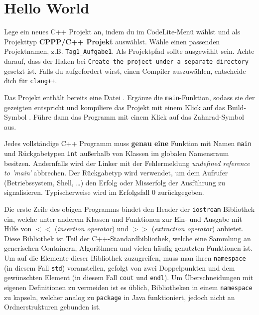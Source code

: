 
\section{\ExercisePrefixBasics Hello World}
Lege ein neues C++ Projekt an, indem du  im CodeLite-Menü wählst und als Projekttyp \textbf{CPPP/C++ Projekt} auswählst.
Wähle einen passenden Projektnamen, z.B. \texttt{Tag1\_Aufgabe1}.
Als Projektpfad sollte  ausgewählt sein. Achte darauf, dass der Haken bei \texttt{Create the project under a separate directory} gesetzt ist.
Falls du aufgefordert wirst, einen Compiler auszuwählen, entscheide dich für \texttt{clang++}.

Das Projekt enthält bereits eine Datei .
Ergänze die \texttt{main}-Funktion, sodass sie der gezeigten entspricht und kompiliere das Projekt mit einem Klick auf das Build-Symbol .
Führe dann das Programm mit einem Klick auf das Zahnrad-Symbol  aus.


Jedes vollständige C++ Programm muss \textbf{genau eine} Funktion mit Namen \lstinline{main} und Rückgabetypen \lstinline{int} außerhalb von Klassen im globalen Namensraum besitzen.
Andernfalls wird der Linker mit der Fehlermeldung \emph{undefined reference to 'main'} abbrechen.
Der Rückgabetyp wird verwendet, um dem Aufrufer (Betriebssystem, Shell, \dots) den Erfolg oder Misserfolg der Ausführung zu signalisieren.
Typischerweise wird im Erfolgsfall 0 zurückgegeben.

Die erste Zeile des obigen Programms bindet den Header der \lstinline{iostream} Bibliothek ein, welche unter anderem Klassen und Funktionen zur Ein- und Ausgabe mit Hilfe von $<<$ (\emph{insertion operator}) und $>>$ (\emph{extraction operator}) anbietet.
Diese Bibliothek ist Teil der C++-Standardbibliothek, welche eine Sammlung an generischen Containern, Algorithmen und vielen häufig genutzten Funktionen ist.
Um auf die Elemente dieser Bibliothek zuzugreifen, muss man ihren \lstinline{namespace} (in diesem Fall \lstinline{std}) voranstellen, gefolgt von zwei Doppelpunkten und dem gewünschten Element (in diesem Fall \lstinline{cout} und \lstinline{endl}).
Um Überschneidungen mit eigenen Definitionen zu vermeiden ist es üblich, Bibliotheken in einem \lstinline{namespace} zu kapseln, welcher analog zu \lstinline{package} in Java funktioniert, jedoch nicht an Ordnerstrukturen gebunden ist.

